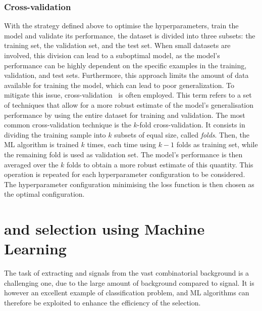 \subsubsection{Cross-validation}

With the strategy defined above to optimise the hyperparameters, train the model and validate its performance, the dataset is divided into three subsets: the training set, the validation set, and the test set. When small datasets are involved, this division can lead to a suboptimal model, as the model's performance can be highly dependent on the specific examples in the training, validation, and test sets. Furthermore, this approach limits the amount of data available for training the model, which can lead to poor generalization. To mitigate this issue, cross-validation~\cite{stone1974cross} is often employed. This term refers to a set of techniques that allow for a more robust estimate of the model's generalisation performance by using the entire dataset for training and validation. The most common cross-validation technique is the $k$-fold cross-validation. It consists in dividing the training sample into $k$ subsets of equal size, called \emph{folds}. Then, the ML algorithm is trained $k$ times, each time using $k-1$ folds as training set, while the remaining fold is used as validation set. The model's performance is then averaged over the $k$ folds to obtain a more robust estimate of this quantity. This operation is repeated for each hyperparameter configuration to be considered. The hyperparameter configuration minimising the loss function is then chosen as the optimal configuration.

\section{\texorpdfstring{\ds and \dpl selection using Machine Learning}{Ds+ and D+ selection using Machine Learning}}

The task of extracting \ds and \dpl signals from the vast combinatorial background is a challenging one, due to the large amount of background compared to signal. It is however an excellent example of classification problem, and ML algorithms can therefore be exploited to enhance the efficiency of the selection. 

